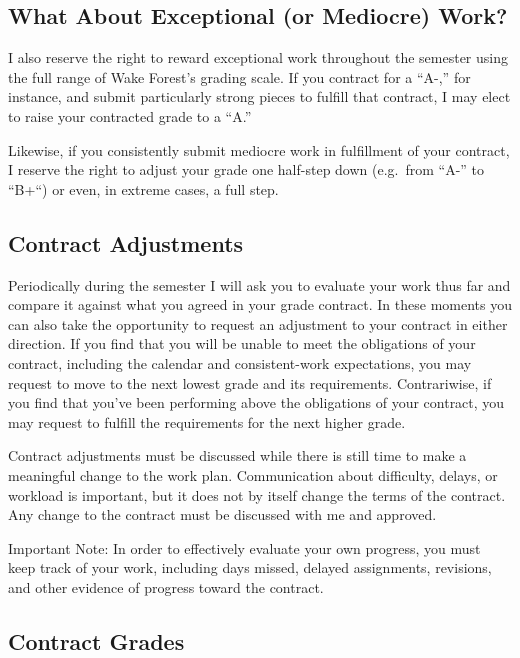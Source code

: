 \documentclass[
]{book}
\begin{document}
\subsection*{What About Exceptional (or Mediocre) Work?}\label{what-about-exceptional-or-mediocre-work-1}


I also reserve the right to reward exceptional work throughout the semester using the full range of Wake Forest's grading scale. If you contract for a ``A-,'' for instance, and submit particularly strong pieces to fulfill that contract, I may elect to raise your contracted grade to a ``A.''

Likewise, if you consistently submit mediocre work in fulfillment of your contract, I reserve the right to adjust your grade one half-step down (e.g.~from ``A-'' to ``B+``) or even, in extreme cases, a full step.

\subsection*{Contract Adjustments}\label{contract-adjustments-1}


Periodically during the semester I will ask you to evaluate your work thus far and compare it against what you agreed in your grade contract. In these moments you can also take the opportunity to request an adjustment to your contract in either direction. If you find that you will be unable to meet the obligations of your contract, including the calendar and consistent-work expectations, you may request to move to the next lowest grade and its requirements. Contrariwise, if you find that you've been performing above the obligations of your contract, you may request to fulfill the requirements for the next higher grade.

Contract adjustments must be discussed while there is still time to make a meaningful change to the work plan. Communication about difficulty, delays, or workload is important, but it does not by itself change the terms of the contract. Any change to the contract must be discussed with me and approved.

Important Note: In order to effectively evaluate your own progress, you must keep track of your work, including days missed, delayed assignments, revisions, and other evidence of progress toward the contract.

\subsection*{Contract Grades}\label{contract-grades-1}
\end{document}
